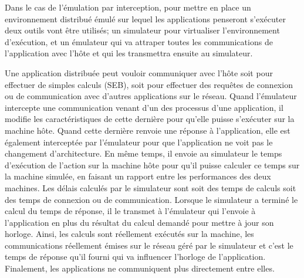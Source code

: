 Dans le cas de l'émulation par interception, pour mettre en place un
environnement distribué émulé sur lequel les applications penseront s'exécuter
deux outils vont être utilisés; un simulateur pour virtualiser l'environnement
d'exécution, et un émulateur qui va attraper toutes les communications de
l'application avec l'hôte et qui les transmettra ensuite au simulateur.

 Une application distribuée peut vouloir communiquer avec l'hôte soit pour
 effectuer de simples calculs (SEB), soit pour effectuer des requêtes de
 connexion ou de communication avec d'autres applications sur le réseau. Quand
 l'émulateur intercepte une communication venant d'un des processus d'une
 application, il modifie les caractéristiques de cette dernière pour qu'elle
 puisse s'exécuter sur la machine hôte. Quand cette dernière renvoie une réponse
 à l'application, elle est également interceptée par l'émulateur pour que
 l'application ne voit pas le changement d'architecture. En même temps, il
 envoie au simulateur le temps d'exécution de l'action sur la machine hôte pour
 qu'il puisse calculer ce temps sur la machine simulée, en faisant un rapport
 entre les performances des deux machines. Les délais calculés par le simulateur
 sont soit des temps de calculs soit des temps de connexion ou de
 communication. Lorsque le simulateur a terminé le calcul du temps de réponse,
 il le transmet à l'émulateur qui l'envoie à l'application en plus du résultat
 du calcul demandé pour mettre à jour son horloge. Ainsi, les calculs sont
 réellement exécutés sur la machine, les communications réellement émises sur le
 réseau géré par le simulateur et c'est le temps de réponse qu'il fourni qui va
 influencer l'horloge de l'application. Finalement, les applications ne
 communiquent plus directement entre elles.

